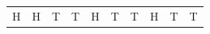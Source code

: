 {\begin{center}
\begin{xtabular*}{\mytablewidth}[t]{|p{10\mystarwidth}|p{10\mystarwidth}|p{10\mystarwidth}|p{10\mystarwidth}|p{10\mystarwidth}|p{10\mystarwidth}|p{10\mystarwidth}|p{10\mystarwidth}|p{10\mystarwidth}|p{10\mystarwidth}|}
    
        H &
    
    
        H &
    
    
        T &
    
    
        T &
    
    
        H &
    
    
        T &
    
    
        T &
    
    
        H &
    
    
        T &
    
    
        T%
     \tabularnewline{}
    

\end{xtabular*}
\end{center}}
